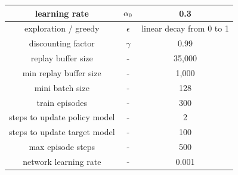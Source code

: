 \documentclass{article}
\begin{document}
\begin{center}
  \begin{tabular}{ |c|c|c| }
    \hline
    learning rate & $\alpha\textsubscript{0}$ & 0.3 \\
    \hline
    exploration / greedy & $\epsilon$ & linear decay from 0 to 1 \\
    \hline
    discounting factor & $\gamma$ & 0.99 \\  
    \hline
    replay buffer size & - & 35,000 \\
    \hline
    min replay buffer size & - & 1,000 \\
    \hline
    mini batch size & - & 128 \\
    \hline
    train episodes & - & 300 \\
    \hline
    steps to update policy model & - & 2 \\
    \hline
    steps to update target model & - & 100  \\
    \hline
    max episode steps & - & 500 \\
    \hline
    network learning rate & - & 0.001 \\
    \hline
  \end{tabular}
  \end{center}
\end{document}
